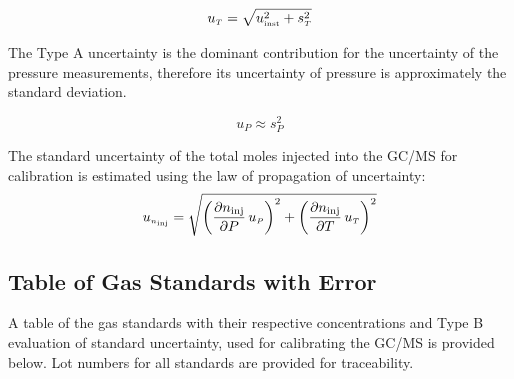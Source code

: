 \documentclass[12pt]{article}
\begin{document}
\begin{equation}
\label{eq:temp_uncertainty}
u_{\scriptscriptstyle T} = \sqrt{ u_{\rm \scriptscriptstyle inst}^2 + s_{\scriptscriptstyle T}^2}
\end{equation}

The Type A uncertainty is the dominant contribution for the uncertainty of the pressure measurements, therefore its uncertainty of pressure is approximately the standard deviation.

\begin{equation}
\label{eq:pressure_uncertainty}
u_{\scriptscriptstyle P} \approx  s_{\scriptscriptstyle P}^2
\end{equation}

The standard uncertainty of the total moles injected into the GC/MS for calibration is estimated using the law of propagation of uncertainty:
\begin{equation}
\label{eq:moles_injected_uncertainty}
u_{\scriptscriptstyle n_{\rm inj}} = \sqrt{{\left( \frac{\partial n_{\rm inj}}{\partial P}\,u_{\scriptscriptstyle P} \right) }^2+{\left(\frac{\partial n_{\rm inj}}{\partial T}\,u_{\scriptscriptstyle T}\right)}^2}
\end{equation}

\pagebreak
\subsection{Table of Gas Standards with Error}
\label{sssec:Table of Gas Standards with Error}
A table of the gas standards with their respective concentrations and Type B evaluation of standard uncertainty, used for calibrating the GC/MS is provided below. Lot numbers for all standards are provided for traceability.
\end{document}
